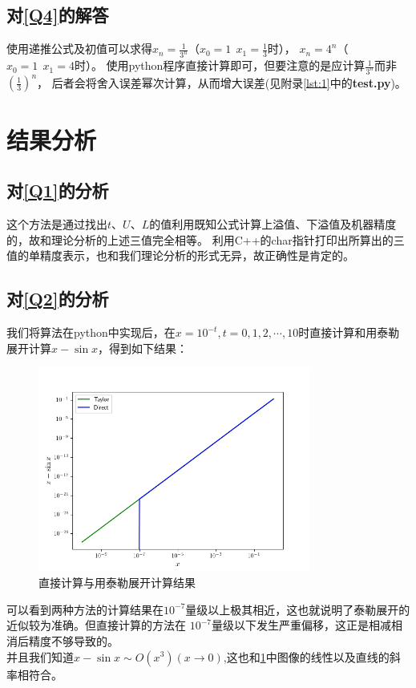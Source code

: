 \documentclass[a4paper,11pt,notitlepage]{article}
\begin{document}
\subsection{对\ref{Q4}的解答}
使用递推公式及初值可以求得$x_{n}=\frac{1}{3^{n}}$（$x_{0}=1\ \ x_{1}=\frac{1}{3}$时），
$x_{n}=4^{n}$（$x_{0}=1\ \ x_{1}=4$时）。
使用python程序直接计算即可，但要注意的是应计算$\frac{1}{3^{n}}$而非$\left(\frac{1}{3}\right)^{n}$，
后者会将舍入误差幂次计算，从而增大误差(见附录\cref{lst:1}中的\textbf{test.py})。

\section{结果分析}
\subsection{对\ref{Q1}的分析}
这个方法是通过找出$t$、$U$、$L$的值利用既知公式计算上溢值、下溢值及机器精度的，故和理论分析的上述三值完全相等。
利用C++的char指针打印出所算出的三值的单精度表示，也和我们理论分析的形式无异，故正确性是肯定的。

\subsection{对\ref{Q2}的分析}
我们将算法在python中实现后，在$x=10^{-t},t=0,1,2,\cdots,10$时直接计算和用泰勒展开计算$x-\sin{x}$，得到如下结果：
\begin{figure}[H]
    \centering
    \includegraphics[width=0.8\textwidth]{../picture/Second_Week_1.png}
    \caption{直接计算与用泰勒展开计算结果}
    \label{pic:1}
\end{figure}
\indent 可以看到两种方法的计算结果在$10^{-7}$量级以上极其相近，这也就说明了泰勒展开的近似较为准确。但直接计算的方法在
$10^{-7}$量级以下发生严重偏移，这正是相减相消后精度不够导致的。\\
\indent 并且我们知道$x-\sin{x} \sim O(x^{3})(x\rightarrow0)$,这也和\cref{pic:1}中图像的线性以及直线的斜率相符合。
\end{document}
